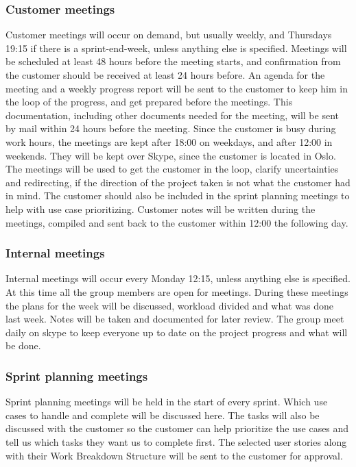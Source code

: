 \subsubsection{Customer meetings}
Customer meetings will occur on demand, but usually weekly, and Thursdays 19:15 if there is a sprint-end-week, unless anything else is specified. Meetings will be scheduled at least 48 hours before the meeting starts, and confirmation from the customer should be received at least 24 hours before. An agenda for the meeting and a weekly progress report will be sent to the customer to keep him in the loop of the progress, and get prepared before the meetings. This documentation, including other documents needed for the meeting, will be sent by mail within 24 hours before the meeting. Since the customer is busy during work hours, the meetings are kept after 18:00 on weekdays, and after 12:00 in weekends. They will be kept over Skype, since the customer is located in Oslo. The meetings will be used to get the customer in the loop, clarify uncertainties and redirecting, if the direction of the project taken is not what the customer had in mind. The customer should also be included in the sprint planning meetings to help with use case prioritizing. Customer notes will be written during the meetings, compiled and sent back to the customer within 12:00 the following day.

\subsubsection{Internal meetings}
Internal meetings will occur every Monday 12:15, unless anything else is specified. At this time all the group members are open for meetings. During these meetings the plans for the week will be discussed, workload divided and what was done last week. Notes will be taken and documented for later review. The group meet daily on skype to keep everyone up to date on the project progress and what will be done.

\subsubsection{Sprint planning meetings}
Sprint planning meetings will be held in the start of every sprint. Which use cases to handle and complete will be discussed here. The tasks will also be discussed with the customer so the customer can help prioritize the use cases and tell us which tasks they want us to complete first. The selected user stories along with their Work Breakdown Structure will be sent to the customer for approval.

